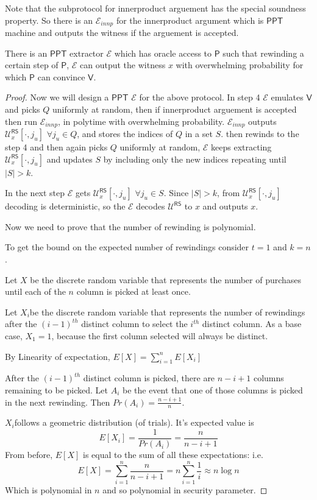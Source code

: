 \documentclass[runningheads]{llncs}
\newcommand{\pnote}[1] {\textcolor{red}  {PKP: \sl{#1}}}
\def\ppt{\mathsf{PPT}}
\def\extrac{\mathcal{E}}
\def\prover{\mathsf{P}}
\def\verifier{\mathsf{V}}
\def\RS{\mathsf{RS}} %
\def\calU{\mathcal{U}}
\begin{document}
	Note that the subprotocol for innerproduct arguement has the special soundness property. So there is an $\extrac_{innp}$ for the innerproduct argument which is $\ppt$ machine and outputs the witness if the arguement is accepted.
	\begin{theorem}\label{theo:1}
		There is an $\ppt$ extractor $\extrac$ which has oracle access to $\prover$ such that rewinding a certain step of $\prover$, $\extrac$ can output the witness $x$ with overwhelming probability for which $\prover$ can convince $\verifier$.
	\end{theorem}
	\begin{proof}
		Now we will design a $\ppt$ $\extrac$ for the above protocol.
		In step 4 $\extrac$ emulates $\verifier$ and picks $Q$ uniformly at random, then if innerproduct arguement is accepted then run $\extrac_{innp}$, in polytime with overwhelming probability. $\extrac_{innp}$ outputs $\calU^{\RS}_x[\cdot,j_u]$ $\forall j_u\in Q$, and stores the indices of $Q$ in a set $S$. then rewinds to the step 4 and then again picks $Q$ uniformly at random, $\extrac$ keeps extracting $\calU^{\RS}_x[\cdot,j_u]$ and updates $S$ by including only the new indices repeating until $|S|>k$.
		
		In the next step $\extrac$ gets $\calU^{\RS}_x[\cdot,j_u]$ $\forall j_u \in S$. Since $|S|>k$, from $\calU^{\RS}_x[\cdot,j_u]$ decoding is deterministic, so the $\extrac$ decodes $\calU^{\RS}$ to $x$ and outputs $x$.
		
		Now we need to prove that the number of rewinding is polynomial.
		
		To get the bound on the expected number of rewindings consider $t=1$ and $k=n$. 
		
		Let $X$ be the discrete random variable that represents the number of purchases until each of the $n$ column is picked at least once.
		
		Let $X_i$​ be the discrete random variable that represents the number of rewindings after the $(i-1)^{th}$ distinct column to select the $i^{th}$ distinct column. As a base case, $X_1=1$, because the first column selected will always be distinct.
		
		By Linearity of expectation, $E[X]=\sum_{i=1}^{n}E[X_i]$
		
		After the $(i-1)^{th}$ distinct column is picked, there are $n-i+1$ columns remaining to be picked. Let $A_i$ be the event that one of those columns is picked in the next rewinding. Then $Pr(A_i)=\frac{n-i+1}{n}$.
		
		$X_i$​ follows a geometric distribution (of trials). It's expected value is
		 $$E[X_i]= \frac{1}{Pr(A_i)} = \frac{n}{n-i+1}$$
		From before, $E[X]$ is equal to the sum of all these expectations: i.e.
		$$E[X] = \sum\limits_{i=1}^{n} \frac{n}{n-i+1} = n\sum\limits_{i=1}^{n} \frac{1}{i} \approx n \log n$$
		Which is polynomial in $n$ and so polynomial in security parameter.
	\end{proof}
	
\end{document}
